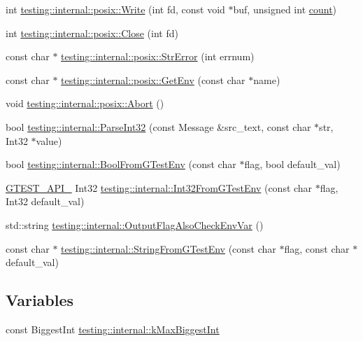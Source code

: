 \begin{DoxyCompactItemize}
int \mbox{\hyperlink{namespacetesting_1_1internal_1_1posix_af4acf9f78d55f815a18b43786511abef}{testing\+::internal\+::posix\+::\+Write}} (int fd, const void $\ast$buf, unsigned int \mbox{\hyperlink{gmock__stress__test_8cc_afd9db40e3361ae09188795e8cbe19752}{count}})
\item 
int \mbox{\hyperlink{namespacetesting_1_1internal_1_1posix_a15e5b8f2a535ef1b2529b85b861e4846}{testing\+::internal\+::posix\+::\+Close}} (int fd)
\item 
const char $\ast$ \mbox{\hyperlink{namespacetesting_1_1internal_1_1posix_a4b77b14af6f4d18f83d303b98e9349c4}{testing\+::internal\+::posix\+::\+Str\+Error}} (int errnum)
\item 
const char $\ast$ \mbox{\hyperlink{namespacetesting_1_1internal_1_1posix_a1d5e3da5a27eed25986859fa83cafe95}{testing\+::internal\+::posix\+::\+Get\+Env}} (const char $\ast$name)
\item 
void \mbox{\hyperlink{namespacetesting_1_1internal_1_1posix_a69b8278c59359dd6a6f941b4643db9fb}{testing\+::internal\+::posix\+::\+Abort}} ()
\item 
bool \mbox{\hyperlink{namespacetesting_1_1internal_ac06fc81336a3d80755f4020d34321766}{testing\+::internal\+::\+Parse\+Int32}} (const Message \&src\+\_\+text, const char $\ast$str, Int32 $\ast$value)
\item 
bool \mbox{\hyperlink{namespacetesting_1_1internal_a67132cdce23fb71b6c38ee34ef81eb4c}{testing\+::internal\+::\+Bool\+From\+G\+Test\+Env}} (const char $\ast$flag, bool default\+\_\+val)
\item 
\mbox{\hyperlink{gtest-port_8h_aa73be6f0ba4a7456180a94904ce17790}{G\+T\+E\+S\+T\+\_\+\+A\+P\+I\+\_\+}} Int32 \mbox{\hyperlink{namespacetesting_1_1internal_a0f7e728793f9e6cb0aa2b69eaa468bf3}{testing\+::internal\+::\+Int32\+From\+G\+Test\+Env}} (const char $\ast$flag, Int32 default\+\_\+val)
\item 
std\+::string \mbox{\hyperlink{namespacetesting_1_1internal_a0c793c6d84760d900299916c077a1af4}{testing\+::internal\+::\+Output\+Flag\+Also\+Check\+Env\+Var}} ()
\item 
const char $\ast$ \mbox{\hyperlink{namespacetesting_1_1internal_a7ed785df46a339403b0f749d3a879201}{testing\+::internal\+::\+String\+From\+G\+Test\+Env}} (const char $\ast$flag, const char $\ast$default\+\_\+val)
\end{DoxyCompactItemize}
\subsection*{Variables}
\begin{DoxyCompactItemize}
\item 
const Biggest\+Int \mbox{\hyperlink{namespacetesting_1_1internal_ad901880198832bc166d2493096b451f7}{testing\+::internal\+::k\+Max\+Biggest\+Int}}
\end{DoxyCompactItemize}


